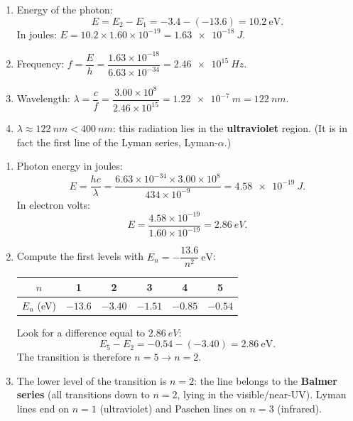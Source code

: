 \documentclass[11pt]{article}
\begin{document}
\begin{corrige}
\begin{enumerate}
\item Energy of the photon:
\[ E = E_2 - E_1 = -3.4 - (-13.6) = \boxed{10.2\ \mathrm{eV}}. \]
In joules: $E = 10.2 \times 1.60\times 10^{-19} = \boxed{\SI{1.63e-18}{J}}$.
\item Frequency: $f = \dfrac{E}{h} = \dfrac{1.63\times 10^{-18}}{6.63\times 10^{-34}} = \boxed{\SI{2.46e15}{Hz}}$.
\item Wavelength: $\lambda = \dfrac{c}{f} = \dfrac{3.00\times 10^{8}}{2.46\times 10^{15}} = \boxed{\SI{1.22e-7}{m}} = \SI{122}{nm}$.
\item $\lambda \approx \SI{122}{nm} < \SI{400}{nm}$: this radiation lies in the \textbf{ultraviolet} region. (It is in fact the first line of the Lyman series, Lyman-$\alpha$.)
\end{enumerate}
\end{corrige}

\begin{corrige}
\begin{enumerate}
\item Photon energy in joules:
\[ E = \frac{hc}{\lambda} = \frac{6.63\times 10^{-34} \times 3.00\times 10^{8}}{434\times 10^{-9}} = \SI{4.58e-19}{J}. \]
In electron volts:
\[ E = \frac{4.58\times 10^{-19}}{1.60\times 10^{-19}} = \boxed{\SI{2.86}{eV}}. \]
\item Compute the first levels with $E_n = -\dfrac{13.6}{n^{2}}\ \mathrm{eV}$:
\begin{center}
\begin{tabular}{|c|ccccc|}
\hline
\rowcolor{popblueL} $n$ & 1 & 2 & 3 & 4 & 5 \\
\hline
$E_n$ (eV) & $-13.6$ & $-3.40$ & $-1.51$ & $-0.85$ & $-0.54$ \\
\hline
\end{tabular}
\end{center}
Look for a difference equal to $\SI{2.86}{eV}$:
\[ E_5 - E_2 = -0.54 - (-3.40) = 2.86\ \mathrm{eV}. \]
The transition is therefore $\boxed{n = 5 \rightarrow n = 2}$.
\item The lower level of the transition is $n = 2$: the line belongs to the \textbf{Balmer series} (all transitions down to $n = 2$, lying in the visible/near-UV). Lyman lines end on $n = 1$ (ultraviolet) and Paschen lines on $n = 3$ (infrared).
\end{enumerate}
\end{corrige}
\end{document}
